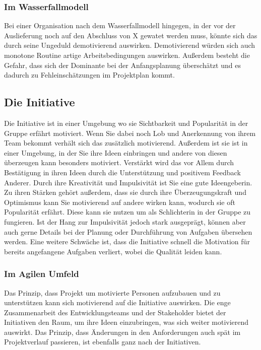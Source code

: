 \documentclass[twocolumn,10pt]{asme2ej}
\begin{document}
\subsubsection{Im Wasserfallmodell}
Bei einer Organisation nach dem Wasserfallmodell hingegen, in der vor der Auslieferung noch auf den Abschluss von X gewatet werden muss, könnte sich das durch seine Ungeduld demotivierend auswirken. Demotivierend würden sich auch monotone Routine artige Arbeitsbedingungen auswirken. Außerdem besteht die Gefahr, dass sich der Dominante bei der Anfangsplanung überschätzt und es dadurch zu Fehleinschätzungen im Projektplan kommt. 


\subsection{Die Initiative}
Die Initiative ist in einer Umgebung wo sie Sichtbarkeit und Popularität in der Gruppe erfährt motiviert. Wenn Sie dabei noch Lob und Anerkennung von ihrem Team bekommt verhält sich das zusätzlich motivierend.  Außerdem ist sie ist in einer Umgebung, in der Sie ihre Ideen einbringen und andere von diesen überzeugen kann besonders motiviert. Verstärkt wird das vor Allem durch Bestätigung in ihren Ideen durch die Unterstützung und positivem Feedback Anderer. Durch ihre Kreativität und Impulsivität ist Sie eine gute Ideengeberin. Zu ihren Stärken gehört außerdem, dass sie durch ihre Überzeugungskraft und Optimismus kann Sie motivierend auf andere wirken kann,  wodurch sie oft Popularität erfährt. Diese kann sie nutzen um als Schlichterin in der Gruppe zu fungieren. Ist der Hang zur Impulsivität jedoch stark ausgeprägt,  können aber auch gerne Details bei der Planung oder Durchführung von Aufgaben übersehen werden. Eine weitere Schwäche ist, dass die Initiative schnell die Motivation für bereits angefangene Aufgaben verliert, wobei die Qualität leiden kann.

\subsubsection{Im Agilen Umfeld}
Das Prinzip, dass Projekt um motivierte Personen aufzubauen und zu unterstützen kann sich motivierend auf die Initiative auswirken. Die enge Zusammenarbeit des Entwicklungsteams und der Stakeholder bietet der Initiativen den Raum, um ihre Ideen einzubringen, was sich weiter motivierend auswirkt. Das Prinzip, dass Änderungen in den Anforderungen auch spät im Projektverlauf passieren, ist ebenfalls ganz nach der Initiativen.
\end{document}
